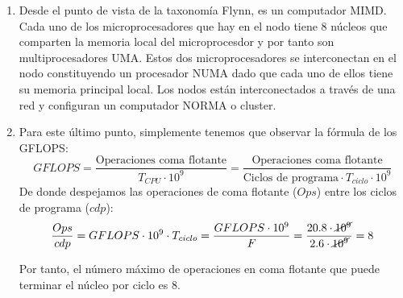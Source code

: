 \begin{ejercicio}
\begin{enumerate}
        \item Desde el punto de vista de la taxonomía Flynn, es un computador MIMD. Cada uno de los microprocesadores que hay en el nodo tiene 8 núcleos que comparten la memoria local del microprocesdor y por tanto son multiprocesadores UMA. Estos dos microprocesadores se interconectan en el nodo constituyendo un procesador NUMA dado que cada uno de ellos tiene su memoria principal local. Los nodos están interconectados a través de una red y configuran un computador NORMA o cluster.

        \item Para este último punto, simplemente tenemos que observar la fórmula de los GFLOPS:
            \begin{equation*}
                GFLOPS = \dfrac{\text{Operaciones coma flotante}}{T_{CPU}\cdot 10^9} = \dfrac{\text{Operaciones coma flotante}}{\text{Ciclos de programa} \cdot T_{ciclo}\cdot 10^9} 
            \end{equation*}
            De donde despejamos las operaciones de coma flotante ($Ops$) entre los ciclos de programa ($cdp$):
            \begin{equation*}
                \dfrac{Ops}{cdp} = GFLOPS \cdot 10^9\cdot T_{ciclo} = \dfrac{GFLOPS \cdot 10^9}{F} = \dfrac{20.8\cdot \cancel{10^9}}{2.6\cdot \cancel{10^9}} = 8
            \end{equation*}
            
            Por tanto, el número máximo de operaciones en coma flotante que puede terminar el núcleo por ciclo es 8.
    \end{enumerate}
\end{ejercicio}

